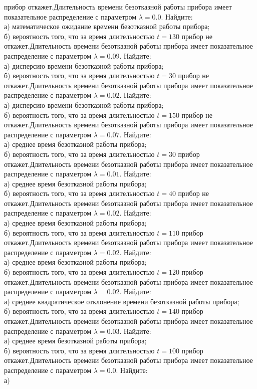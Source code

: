 прибор откажет.Длительность времени безотказной работы прибора имеет показательное распределение с параметром $\lambda = 0.0$. Найдите: \\ \quad а) математическое ожидание времени безотказной работы прибора; \\ \quad б) вероятность того, что за время длительностью $t = 130$ прибор не откажет.Длительность времени безотказной работы прибора имеет показательное распределение с параметром $\lambda = 0.09$. Найдите: \\ \quad а) дисперсию времени безотказной работы прибора; \\ \quad б) вероятность того, что за время длительностью $t = 30$ прибор не откажет.Длительность времени безотказной работы прибора имеет показательное распределение с параметром $\lambda = 0.02$. Найдите: \\ \quad а) дисперсию времени безотказной работы прибора; \\ \quad б) вероятность того, что за время длительностью $t = 150$ прибор не откажет.Длительность времени безотказной работы прибора имеет показательное распределение с параметром $\lambda = 0.07$. Найдите: \\ \quad а) среднее время безотказной работы прибора; \\ \quad б) вероятность того, что за время длительностью $t = 30$ прибор откажет.Длительность времени безотказной работы прибора имеет показательное распределение с параметром $\lambda = 0.01$. Найдите: \\ \quad а) среднее время безотказной работы прибора; \\ \quad б) вероятность того, что за время длительностью $t = 40$ прибор не откажет.Длительность времени безотказной работы прибора имеет показательное распределение с параметром $\lambda = 0.02$. Найдите: \\ \quad а) среднее время безотказной работы прибора; \\ \quad б) вероятность того, что за время длительностью $t = 110$ прибор откажет.Длительность времени безотказной работы прибора имеет показательное распределение с параметром $\lambda = 0.02$. Найдите: \\ \quad а) среднее время безотказной работы прибора; \\ \quad б) вероятность того, что за время длительностью $t = 120$ прибор откажет.Длительность времени безотказной работы прибора имеет показательное распределение с параметром $\lambda = 0.02$. Найдите: \\ \quad а) среднее квадратическое отклонение времени безотказной работы прибора; \\ \quad б) вероятность того, что за время длительностью $t = 140$ прибор откажет.Длительность времени безотказной работы прибора имеет показательное распределение с параметром $\lambda = 0.03$. Найдите: \\ \quad а) среднее время безотказной работы прибора; \\ \quad б) вероятность того, что за время длительностью $t = 100$ прибор откажет.Длительность времени безотказной работы прибора имеет показательное распределение с параметром $\lambda = 0.0$. Найдите: \\ \quad а) 